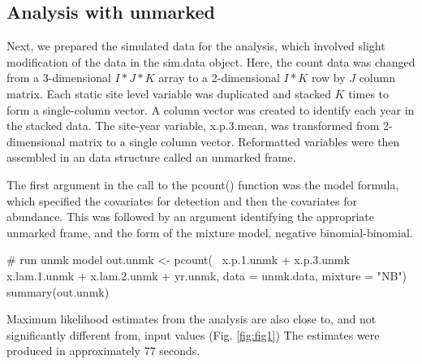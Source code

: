 \documentclass[article]{jss}
\begin{document}
\subsection[Analysis with unmarked]{Analysis with unmarked}
Next, we prepared the simulated data for the  analysis, which involved slight modification of the data in the sim.data object.  Here, the count data was changed from a 3-dimensional $I*J*K$ array to a 2-dimensional $I*K$ row by $J$ column matrix.  Each static site level variable was duplicated and stacked $K$ times to form a single-column vector. A column vector was created to identify each year in the stacked data.  The site-year variable, x.p.3.mean, was transformed from 2-dimensional matrix to a single column vector.  Reformatted variables were then assembled in an  data structure called an unmarked frame.


The first argument in the call to the pcount() function was the model formula, which specified the covariates for detection and then the covariates for abundance.  This was followed by an argument identifying the appropriate unmarked frame, and the form of the mixture model, negative binomial-binomial.

\begin{Code}
# run unmk model
out.unmk <- pcount(~ x.p.1.unmk + x.p.3.unmk
                   ~ x.lam.1.unmk + x.lam.2.unmk + yr.unmk,
                    data = unmk.data, mixture = "NB")
summary(out.unmk)
\end{Code}

Maximum likelihood estimates from the  analysis are also close to, and not significantly different from, input values (Fig. \ref{fig:fig1})  The  estimates were produced in approximately 77 seconds.
\end{document}
